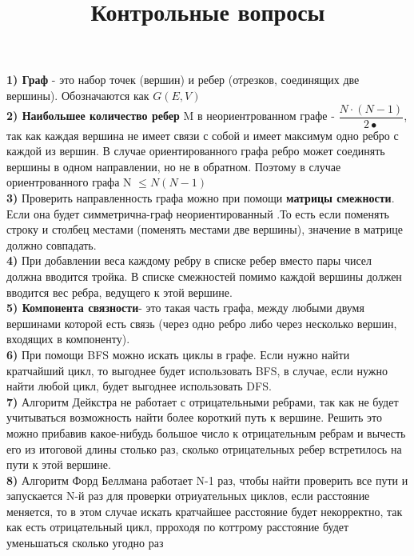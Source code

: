 \documentclass[a4paper, 14pt]{article}
\title{Контрольные вопросы}
\begin{document}
\maketitle
\textbf {1) Граф} - это набор точек (вершин) и ребер (отрезков, соединящих две вершины). Обозначаются как $ G(E,V) $ \\

\textbf{2) Наибольшее количество ребер} M в неориентрованном графе - $ \dfrac{N\cdot(N-1)}{2•} $, так как каждая вершина не имеет связи с собой и имеет максимум одно ребро с каждой из вершин. В случае ориентированного графа ребро может соединять вершины в одном направлении, но не в обратном. Поэтому в случае ориентрованного графа N $ \leq N(N-1) $\\

\textbf{3)} Проверить направленность графа можно при помощи \textbf{матрицы смежности}. Если она будет симметрична-граф неориентированный .То есть если поменять строку и столбец местами (поменять местами две вершины), значение в матрице должно совпадать.\\

\textbf{4)} При добавлении веса каждому ребру в списке ребер вместо пары чисел должна вводится тройка. В списке смежностей помимо каждой вершины должен вводится вес ребра, ведущего к этой вершине.\\

\textbf{5) Компонента связности}- это такая часть графа, между любыми двумя вершинами которой есть связь (через одно ребро либо через несколько вершин, входящих в компоненту).\\

\textbf{6)} При помощи BFS можно искать циклы в графе. Если нужно найти кратчайший цикл, то выгоднее будет использовать BFS, в случае, если нужно найти любой цикл, будет выгоднее использовать DFS.\\

\textbf{7)} Алгоритм Дейкстра не работает с отрицательными ребрами, так как не будет учитываться возможность найти более короткий путь к вершине. Решить это можно прибавив какое-нибудь большое число к отрицательным ребрам и вычесть его из итоговой длины столько раз, сколько отрицательных ребер встретилось на пути к этой вершине.\\

\textbf{8)} Алгоритм Форд Беллмана работает N-1 раз, чтобы найти проверить все пути и запускается N-й раз для проверки отриуательных циклов, если расстояние меняется, то в этом случае искать кратчайшее расстояние будет некорректно, так как есть отрицательный цикл, прроходя по коттрому расстояние будет уменьшаться сколько угодно раз\\
\end{document}
